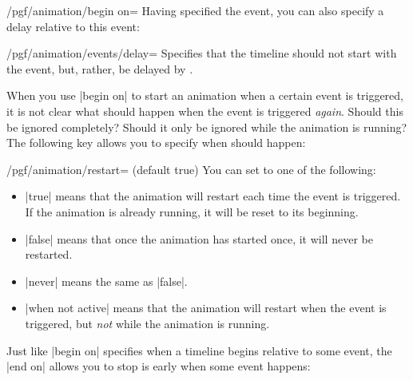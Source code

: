 \begin{key}{/pgf/animation/begin on=}
  Having specified the event, you can also specify a delay relative to
  this event:

  \begin{key}{/pgf/animation/events/delay=}
    Specifies that the timeline should not start with the event, but,
    rather, be delayed by .
  \end{key}
  
\end{key}

When you use |begin on| to start an animation when a certain event is
triggered, it is not clear what should happen when the event is
triggered \emph{again}. Should this be ignored completely? Should it
only be ignored while the animation is running? The following key
allows you to specify when should happen:

\begin{key}{/pgf/animation/restart= (default true)}
  You can set  to one of the following:
  \begin{itemize}
  \item |true| means that the animation will restart each time the
    event is triggered. If the animation is already running, it will
    be reset to its beginning.
  \item |false| means that once the animation has started once, it
    will never be restarted.
\begin{codeexample}[width=2cm]
\end{codeexample}  
  \item |never| means the same as |false|.
  \item |when not active| means that the animation will restart when
    the event is triggered, but \emph{not} while the animation is
    running.     
\begin{codeexample}[width=2cm]
\end{codeexample}  
  \end{itemize}
\end{key}

Just like |begin on| specifies when a timeline begins relative to some
event, the |end on| allows you to stop is early when some event
happens:

